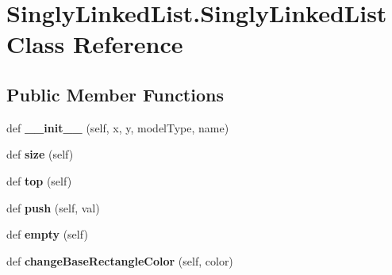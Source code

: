 \hypertarget{class_singly_linked_list_1_1_singly_linked_list}{}\section{Singly\+Linked\+List.\+Singly\+Linked\+List Class Reference}
\label{class_singly_linked_list_1_1_singly_linked_list}
\subsection*{Public Member Functions}
\begin{DoxyCompactItemize}
\item 
\mbox{\label{class_singly_linked_list_1_1_singly_linked_list_a2e508ae2b37528ee587753422068f144}} 
def {\bfseries \+\_\+\+\_\+init\+\_\+\+\_\+} (self, x, y, model\+Type, name)
\item 
\mbox{\label{class_singly_linked_list_1_1_singly_linked_list_a96f6f50cf9bed918fe1f5248c1649f0c}} 
def {\bfseries size} (self)
\item 
\mbox{\label{class_singly_linked_list_1_1_singly_linked_list_af6f27944245081ce67217ffc2a875a76}} 
def {\bfseries top} (self)
\item 
\mbox{\label{class_singly_linked_list_1_1_singly_linked_list_a7e948d77c8c645f33f4fea05844e7a76}} 
def {\bfseries push} (self, val)
\item 
\mbox{\label{class_singly_linked_list_1_1_singly_linked_list_a724e0a860fe1047e11c285dc533f567c}} 
def {\bfseries empty} (self)
\item 
\mbox{\label{class_singly_linked_list_1_1_singly_linked_list_a83ac65fabad4d24148ee485a8c4f372f}} 
def {\bfseries change\+Base\+Rectangle\+Color} (self, color)
\item 
\mbox{\label{class_singly_linked_list_1_1_singly_linked_list_a81b05adc8e8bf959afe66e1923e4e474}} 

\end{DoxyCompactItemize}
